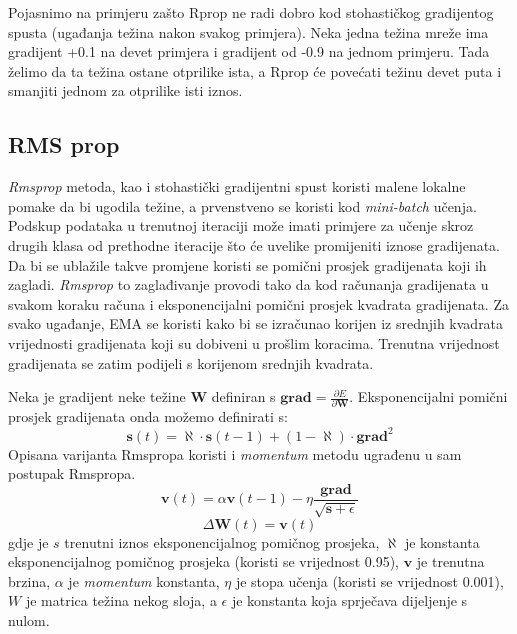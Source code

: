 \documentclass[times, utf8, diplomski, numeric]{fer}
\begin{document}
Pojasnimo na primjeru zašto Rprop ne radi dobro kod stohastičkog gradijentog spusta (ugađanja težina nakon svakog primjera). Neka jedna težina mreže ima gradijent +0.1 na devet primjera i gradijent od -0.9 na jednom primjeru. Tada želimo da ta težina ostane otprilike ista, a Rprop će povećati težinu devet puta i smanjiti jednom za otprilike isti iznos.


\subsection{RMS prop}

\emph{Rmsprop} metoda, kao i stohastički gradijentni spust koristi malene lokalne pomake da bi ugodila težine, a prvenstveno se koristi kod \textit{mini-batch} učenja.
Podskup podataka u trenutnoj iteraciji može imati primjere za učenje skroz drugih klasa od prethodne iteracije što će uvelike promijeniti iznose gradijenata. Da bi se ublažile takve promjene koristi se pomični prosjek gradijenata koji ih zagladi.
\emph{Rmsprop} to zaglađivanje provodi tako da kod računanja gradijenata u svakom koraku računa i eksponencijalni pomični prosjek  kvadrata gradijenata. Za svako ugađanje, EMA se koristi kako bi se izračunao korijen iz srednjih kvadrata  vrijednosti gradijenata koji su dobiveni u prošlim koracima. Trenutna vrijednost gradijenata se zatim podijeli s korijenom srednjih kvadrata.

Neka je gradijent neke težine $\boldsymbol{W}$ definiran s $\boldsymbol{grad} = \frac{\partial E}{\partial \boldsymbol{W}}$. Eksponencijalni pomični prosjek gradijenata onda možemo definirati s:
\begin{equation}
  \boldsymbol{s}(t) = \aleph \cdot \boldsymbol{s}(t-1) + (1 - \aleph) \cdot \boldsymbol{grad}^2
\end{equation}
Opisana varijanta Rmspropa \cite{Graves13} koristi i \emph{momentum} metodu ugrađenu u sam postupak Rmspropa.
\begin{equation} %
  \boldsymbol{v}(t) = \alpha \boldsymbol{v}(t-1) - \eta \frac{\boldsymbol{grad}}{\sqrt{\boldsymbol{s} + \epsilon}}
\end{equation}
\begin{equation} %
  \Delta \boldsymbol{W}(t) = \boldsymbol{v}(t)
\end{equation}
gdje je $s$ trenutni iznos eksponencijalnog pomičnog prosjeka, $\aleph$ je konstanta eksponencijalnog pomičnog prosjeka (koristi se vrijednost 0.95),  $\boldsymbol{v}$ je trenutna brzina, $\alpha$ je \emph{momentum} konstanta, $\eta$ je stopa učenja (koristi se vrijednost 0.001), $W$ je matrica težina nekog sloja, a $\epsilon$ je konstanta koja sprječava dijeljenje s nulom.
\end{document}
